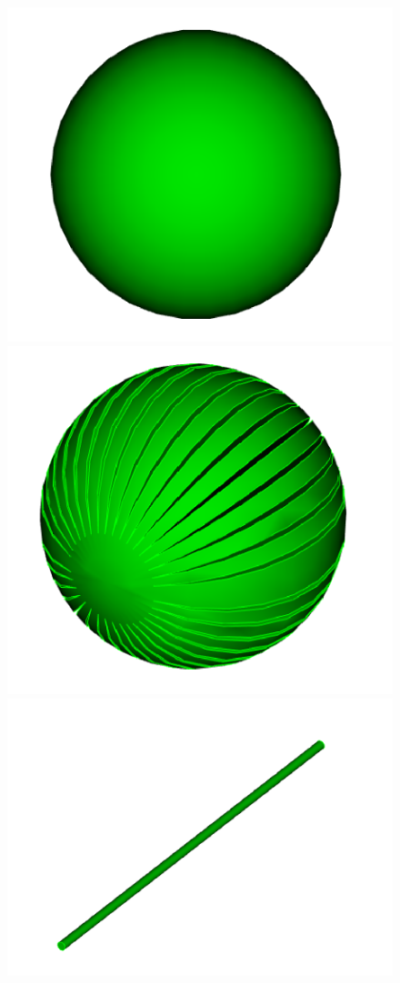 \documentclass[12pt, a4paper]{article}
\begin{document}
\begin{figure}
\begin{center}
    \includegraphics[scale=0.1]{sphere.png}
    \includegraphics[scale=0.1]{ds.png}
    \includegraphics[scale=0.1]{larcyl.png}

\end{center}
\end{figure}
\end{document}
